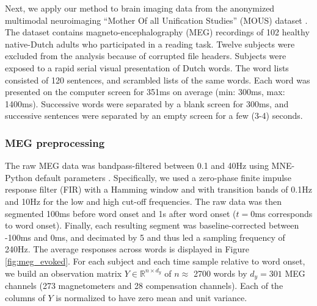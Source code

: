 
Next, we apply our method to brain imaging data from the anonymized multimodal
neuroimaging ``Mother Of all Unification Studies'' (MOUS) dataset
\citep{schoffelen2019204}. The dataset contains magneto-encephalography (MEG)
recordings of 102 healthy native-Dutch adults who participated in a reading
task. Twelve subjects were excluded from the analysis because of corrupted file headers.
%
Subjects were exposed to a rapid serial visual presentation of Dutch words. The
word lists consisted of 120 sentences, and scrambled lists of the same words.
Each word was presented on the computer screen for 351ms on average (min: 300ms,
max: 1400ms). Successive words were separated by a blank screen for 300ms, and
successive sentences were separated by an empty screen for a few (3-4) seconds.

\subsubsection{MEG preprocessing}

The raw MEG data was bandpass-filtered between 0.1 and 40Hz using MNE-Python
default parameters \citep{gramfort2013meg, gramfort2014mne}. Specifically, we used a zero-phase finite impulse
response filter (FIR) with a Hamming window and with transition bands of 0.1Hz
and 10Hz for the low and high cut-off frequencies. The raw data was then segmented 100ms before word onset and 1s after
word onset ($t=0$ms corresponds to word onset). Finally, each resulting
segment was baseline-corrected between -100ms and 0ms, and decimated by 5 and
thus led a sampling frequency of 240Hz. The average responses across words is displayed in Figure \ref{fig:meg_evoked}.
For each subject and each time sample relative to word onset, we
build an observation matrix $Y \in \mathbb{R}^{n \times d_y}$ of $n\approx$ 2700 words
by $d_y=301$ MEG channels (273 magnetometers and 28 compensation channels). Each
of the columns of $Y$ is normalized to have zero mean and unit variance.

